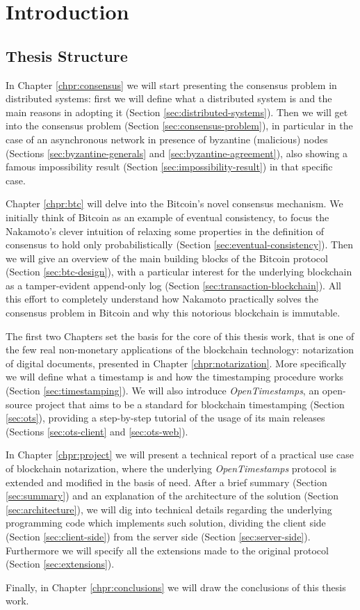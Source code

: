 \chapter{Introduction}
\label{chpr:intro}

\section{Thesis Structure}
In Chapter \ref{chpr:consensus} we will start presenting the consensus problem in distributed systems: first we will define what a distributed system is and the main reasons in adopting it (Section \ref{sec:distributed-systems}). Then we will get into the consensus problem (Section \ref{sec:consensus-problem}), in particular in the case of an asynchronous network in presence of byzantine (malicious) nodes (Sections \ref{sec:byzantine-generals} and \ref{sec:byzantine-agreement}), also showing a famous impossibility result (Section \ref{sec:impossibility-result}) in that specific case.

\bigskip
\noindent
Chapter \ref{chpr:btc} will delve into the Bitcoin's novel consensus mechanism. We initially think of Bitcoin as an example of eventual consistency, to focus the Nakamoto's clever intuition of relaxing some properties in the definition of consensus to hold only probabilistically (Section \ref{sec:eventual-consistency}). Then we will give an overview of the main building blocks of the Bitcoin protocol (Section \ref{sec:btc-design}), with a particular interest for the underlying blockchain as a tamper-evident append-only log (Section \ref{sec:transaction-blockchain}). All this effort to completely understand how Nakamoto practically solves the consensus problem in Bitcoin and why this notorious blockchain is immutable.

\bigskip
\noindent
The first two Chapters set the basis for the core of this thesis work, that is one of the few real non-monetary applications of the blockchain technology: notarization of digital documents, presented in Chapter \ref{chpr:notarization}. More specifically we will define what a timestamp is and how the timestamping procedure works (Section \ref{sec:timestamping}). We will also introduce \textit{OpenTimestamps}, an open-source project that aims to be a standard for blockchain timestamping (Section \ref{sec:ots}), providing a step-by-step tutorial of the usage of its main releases (Sections \ref{sec:ots-client} and \ref{sec:ots-web}).

\bigskip
\noindent
In Chapter \ref{chpr:project} we will present a technical report of a practical use case of blockchain notarization, where the underlying \textit{OpenTimestamps} protocol is extended and modified in the basis of need. After a brief summary (Section \ref{sec:summary}) and an explanation of the architecture of the solution (Section \ref{sec:architecture}), we will dig into technical details regarding the underlying programming code which implements such solution, dividing the client side (Section \ref{sec:client-side}) from the server side (Section \ref{sec:server-side}). Furthermore we will specify all the extensions made to the original protocol (Section \ref{sec:extensions}).

\bigskip
\noindent
Finally, in Chapter \ref{chpr:conclusions} we will draw the conclusions of this thesis work.